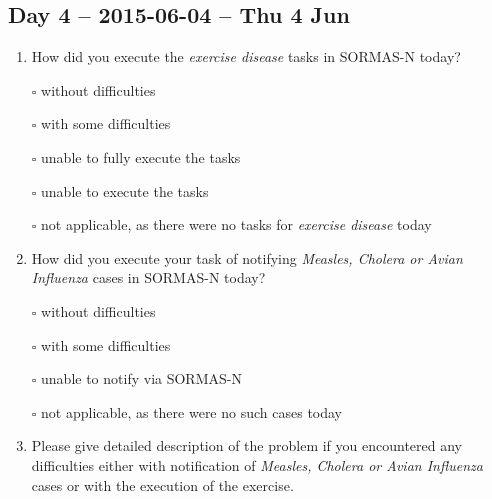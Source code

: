 \documentclass[a4paper, titlepage]{tufte-handout}
\begin{document}
\subsection{Day 4 -- 2015-06-04 -- Thu  4 Jun}
\label{sec-8-4}
\begin{enumerate}
\item How did you execute the \emph{exercise disease} tasks in SORMAS-N today?

\quad $\square$ without difficulties

\quad $\square$ with some difficulties

\quad $\square$ unable to fully execute the tasks

\quad $\square$ unable to execute the tasks

\quad $\square$ not applicable, as there were no tasks for \emph{exercise disease} today

\item How did you execute your task of notifying \emph{Measles, Cholera or Avian Influenza} cases in SORMAS-N today?

\quad $\square$ without difficulties

\quad $\square$ with some difficulties

\quad $\square$ unable to notify via SORMAS-N

\quad $\square$ not applicable, as there were no such cases today

\item Please give detailed description of the problem if you encountered any difficulties either with notification of \emph{Measles, Cholera or Avian Influenza} cases or with the execution of the exercise.

\hrulefill

\hrulefill

\hrulefill

\hrulefill

\hrulefill

\hrulefill

\hrulefill

\hrulefill

\hrulefill

\hrulefill
\end{enumerate}

\newpage
\end{document}
